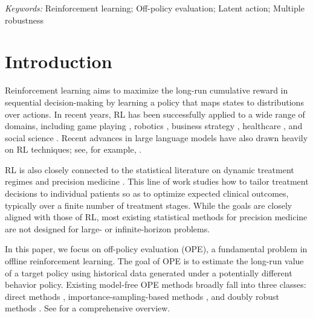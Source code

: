 \documentclass[12pt]{article}
\newcommand{\0}{\boldsymbol{0}}
\begin{document}
\noindent%
{\it Keywords:} Reinforcement learning; Off-policy evaluation; Latent action; Multiple robustness
\vfill

\newpage
{}



\section{Introduction} \label{sec:intro}

Reinforcement learning \citep[RL;][]{sutton2018} aims to maximize the long-run cumulative reward in sequential decision-making by learning a policy that maps states to distributions over actions. In recent years, RL has been successfully applied to a wide range of domains, including game playing \citep{silver2016mastering}, robotics \citep{levine2020offline,zhong2026risk}, business strategy \citep{den2015dynamic,bian2024tale,liu2025contextual}, healthcare \citep{liao2022batch,zhou2024federated,chen2026data}, and social science \citep{li2026reinforcement}. Recent advances in large language models have also drawn heavily on RL techniques; see, for example, \citet{ouyang2022training,rafailov2023direct}.

RL is also closely connected to the statistical literature on dynamic treatment regimes and precision medicine \citep{Murphy,gest,qian2011performance,zhao2012estimating,zhang2012robust,wallace2015doubly,wang2018quantile,kitagawa2018should,shi2018high,qi2020multi,athey2021policy,cui2021semiparametric,bian2023variable, shen2024statistical}. This line of work studies how to tailor treatment decisions to individual patients so as to optimize expected clinical outcomes, typically over a finite number of treatment stages. While the goals are closely aligned with those of RL, most existing statistical methods for precision medicine are not designed for large- or infinite-horizon problems.

In this paper, we focus on off-policy evaluation (OPE), a fundamental problem in offline reinforcement learning. The goal of OPE is to estimate the long-run value of a target policy using historical data generated under a potentially different behavior policy. Existing model-free OPE methods broadly fall into three classes: direct methods \citep{ernst2005tree,le2019batch,shi2022statistical,chen2022well}, importance-sampling-based methods \citep{precup2000eligibility,liu2018breaking,nachum2019dualdice,uehara2020minimax,wang2023projected}, and doubly robust methods \citep{jiang2016doubly,thomas2016data,kallus2022efficiently,liao2022batch}. See \citet{uehara2022review} for a comprehensive overview.
\end{document}
